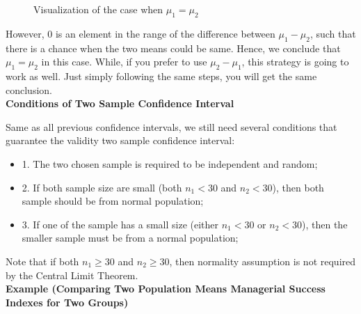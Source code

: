\begin{center}
\begin{figure}[h!]
\centering
{}
\caption{Visualization of the case when $\mu_1 = \mu_2$}
\end{figure}
\end{center}

However, 0 is an element in the range of the difference between $\mu_1 - \mu_2$, such that there is a chance when the two means could be same. Hence, we conclude that $\mu_1 = \mu_2$ in this case. While, if you prefer to use $\mu_2 - \mu_1$, this strategy is going to work as well. Just simply following the same steps, you will get the same conclusion.\\

\textbf{Conditions of Two Sample Confidence Interval}

Same as all previous confidence intervals, we still need several conditions that guarantee the validity two sample confidence interval:

\begin{itemize}
	\item 1. The two chosen sample is required to be independent and random;
	\item 2. If both sample size are small (both $n_1 < 30$ and $n_2 < 30$), then both sample should be from normal population;
	\item 3. If one of the sample has a small size (either $n_1 < 30$ or $n_2 < 30$), then the smaller sample must be from a normal population;
\end{itemize}

Note that if both $n_1 \ge 30$ and $n_2 \ge 30$, then normality assumption is not required by the Central Limit Theorem.\\

\textbf{Example (Comparing Two Population Means Managerial Success Indexes for Two Groups)}

